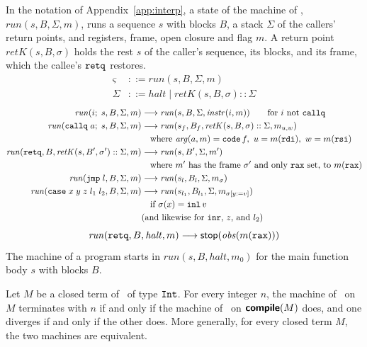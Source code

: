 In the notation of Appendix~\ref{app:interp}, a state of the machine of \instr, $\mathit{run}(s, B, \Sigma, m)$, runs a sequence $s$ with blocks $B$, a stack $\Sigma$ of the callers' return points, and registers, frame, open closure and flag $m$. A return point $\mathit{retK}(s, B, \sigma)$ holds the rest $s$ of the caller's sequence, its blocks, and its frame, which the callee's $\mathtt{retq}$ restores.
\begin{align*}
  \varsigma &::= \mathit{run}(s, B, \Sigma, m) \\
  \Sigma &::= \mathit{halt} \mid \mathit{retK}(s, B, \sigma) :: \Sigma
\end{align*}
\begin{align*}
  \mathit{run}(i;\; s, B, \Sigma, m) &\longrightarrow \mathit{run}(s, B, \Sigma, \mathit{instr}(i, m))
    \qquad\text{for $i$ not $\mathtt{callq}$} \\
  \mathit{run}(\mathtt{callq}\; a;\; s, B, \Sigma, m) &\longrightarrow \mathit{run}(s_f, B_f, \mathit{retK}(s, B, \sigma) :: \Sigma, m_{u,w}) \\
 & \quad\text{where } \mathit{arg}(a, m) = \mathtt{code}\,f,\ u = m(\mathtt{rdi}),\ w = m(\mathtt{rsi}) \\
  \mathit{run}(\mathtt{retq}, B, \mathit{retK}(s, B', \sigma') :: \Sigma, m) &\longrightarrow \mathit{run}(s, B', \Sigma, m') \\
 & \quad\text{where $m'$ has the frame $\sigma'$ and only $\mathtt{rax}$ set, to $m(\mathtt{rax})$} \\
  \mathit{run}(\mathtt{jmp}\;l, B, \Sigma, m) &\longrightarrow \mathit{run}(s_l, B_l, \Sigma, m_\sigma) \\
  \mathit{run}(\mathtt{case}\;x\;y\;z\;l_1\;l_2, B, \Sigma, m) &\longrightarrow \mathit{run}(s_{l_1}, B_{l_1}, \Sigma, m_{\sigma[y{:=}v]}) \\
 & \quad\text{if } \sigma(x) = \mathtt{inl}\,v \\
 & \text{(and likewise for $\mathtt{inr}$, $z$, and $l_2$)}
\end{align*}
\[
  \mathit{run}(\mathtt{retq}, B, \mathit{halt}, m) \longrightarrow \mathsf{stop}(\mathit{obs}(m(\mathtt{rax})))
\]
The machine of a program starts in $\mathit{run}(s, B, \mathit{halt},
m_0)$ for the main function body $s$ with blocks $B$.

\begin{proposition}\label{prop:machines}
Let $M$ be a closed term of \fpc\ of type $\mathtt{Int}$. For every integer $n$, the machine of \fpc\ on $M$ terminates with $n$ if and only if the machine of \instr\ on $\textsf{\bfseries compile}(M)$ does, and one diverges if and only if the other does. More generally, for every closed term $M$, the two machines are equivalent.
\end{proposition}

